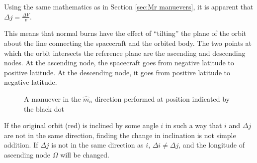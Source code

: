 \documentclass[../basicOrbitalDynamics.tex]{subfiles}
\begin{document}
Using the same mathematics as in Section  \ref{sec:Mr manuevers}, it is apparent that $\Delta j=\frac{\Delta V}{v}$.

This means that normal burns have the effect of ``tilting'' the plane of the orbit about the line connecting the spacecraft and the orbited body. The two points at which the orbit intersects the reference plane are the ascending and descending nodes. At the ascending node, the spacecraft goes from negative latitude to positive latitude. At the descending node, it goes from positive latitude to negative latitude.

\begin{figure}[H]
    \centering
    \def\ecc{0}
    \def\SMA{3}
    \def\incI{20}
    \def\dJ{20}


    \caption{A manuever in the $\hat{m}_n$ direction performed at position indicated by the black dot}\label{fig:Inclination Changes}
\end{figure}

If the original orbit (red) is inclined by some angle $i$ in such a way that $i$ and $\Delta j$ are not in the same direction, finding the change in inclination is not simple addition. If $\Delta j$ is not in the same direction as $i$, $\Delta i \ne \Delta j$, and the longitude of ascending node $\Omega$ will be changed.
\end{document}

